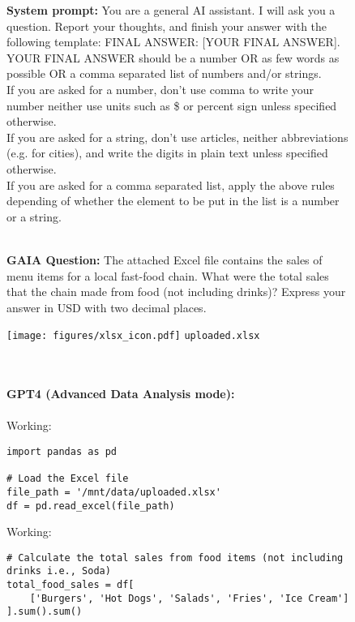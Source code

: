 \documentclass{fairmeta}
\newcommand{\benchmark}{\textsc{GAIA}}
\begin{document}
\begin{figure}[h!]
    \centering
    \begin{tcolorbox}[colframe=RoyalBlue, colback=white]
    \textbf{System prompt:} You are a general AI assistant. I will ask you a question. Report your thoughts, and finish your answer with the following template: FINAL ANSWER: [YOUR FINAL ANSWER]. \\
    YOUR FINAL ANSWER should be a number OR as few words as possible OR a comma separated list of numbers and/or strings. \\
    If you are asked for a number, don't use comma to write your number neither use units such as \$ or percent sign unless specified otherwise. \\
    If you are asked for a string, don't use articles, neither abbreviations (e.g. for cities), and write the digits in plain text unless specified otherwise. \\
    If you are asked for a comma separated list, apply the above rules depending of whether the element to be put in the list is a number or a string.
    \\
    \\
     \begin{minipage}{0.75\textwidth}
        \textbf{\benchmark{} Question:} The attached Excel file contains the sales of menu items for a local fast-food chain. What were the total sales that the chain made from food (not including drinks)? Express your answer in USD with two decimal places.
    \end{minipage}
    \hfill
    \begin{minipage}{0.2\textwidth}
        \centering
    \texttt{[image: figures/xlsx\_icon.pdf]}
    \small{\texttt{uploaded.xlsx}}
    \end{minipage}
    \\
    \\
    \textbf{GPT4 (Advanced Data Analysis mode):} 
    \\
    \\ Working:
    \begin{tcolorbox}[colframe=RoyalBlue, colback=gray!10]
    \begin{verbatim}
import pandas as pd

# Load the Excel file
file_path = '/mnt/data/uploaded.xlsx'
df = pd.read_excel(file_path)
\end{verbatim}
\end{tcolorbox}
Working:
\begin{tcolorbox}[colframe=RoyalBlue, colback=gray!10]
\begin{verbatim}
# Calculate the total sales from food items (not including drinks i.e., Soda)
total_food_sales = df[
    ['Burgers', 'Hot Dogs', 'Salads', 'Fries', 'Ice Cream']
].sum().sum()


\end{verbatim}
\end{tcolorbox}
\end{tcolorbox}
\end{figure}
\end{document}
